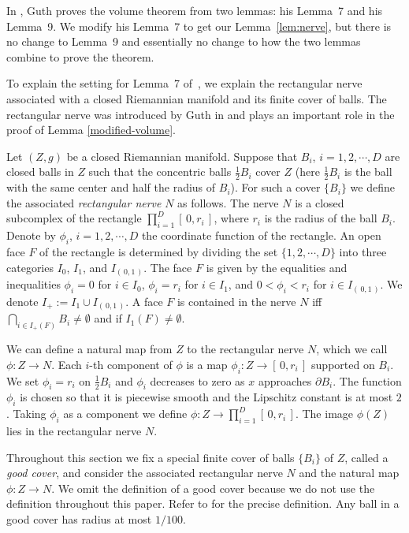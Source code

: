 \documentclass[12pt]{amsart}
\numberwithin{equation}{section}
\begin{document}
In \cite{Guth11}, Guth proves the volume theorem from two lemmas: his Lemma~7 and his Lemma~9.  We modify his Lemma~7 to get our Lemma~\ref{lem:nerve}, but there is no change to Lemma~9 and essentially no change to how the two lemmas combine to prove the theorem.

To explain the setting for Lemma~7 of~\cite{Guth11},  we explain the rectangular nerve associated with a closed Riemannian manifold and its finite cover of balls. The rectangular
nerve was introduced by Guth in \cite{Guth11} and plays an important role in
the proof of Lemma \ref{modified-volume}.

Let $(Z,g)$ be a closed Riemannian manifold. Suppose that $B_i$,
$i=1,2,\cdots, D$ are closed balls in $Z$ such that the concentric balls
$\frac{1}{2}B_i$ cover $Z$ (here $\frac{1}{2}B_i$ is the ball with the
same center and half the radius of $B_i$). For such a cover $\{ B_i\}$ we define the
associated \emph{rectangular nerve} $N$ as follows. The nerve $N$ is a closed subcomplex of the rectangle $\prod_{i=1}^D [\, 0,r_i\,]$, where $r_i$ is
the radius of the ball $B_i$. Denote by $\phi_i$, $i=1,2,\cdots,D$ the coordinate function
of the rectangle. An open face $F$ of the rectangle is determined by
dividing the set $\{1,2,\cdots, D \}$ into three categories $I_0$,
$I_1$, and $I_{(\, 0,1\,)}$. The face $F$ is given by the equalities and
inequalities $\phi_i=0$ for $i\in I_0$, $\phi_i=r_i$ for $i\in I_1$, and
$0<\phi_i<r_i$ for $i\in I_{(\,0,1\,)}$. We denote $I_+:=I_1\cup I_{(\,0,1 \,)}$. A face $F$ is contained in the
nerve $N$ iff $\bigcap_{i\in I_+ (F)}B_i \neq \emptyset$ and if
$I_1(F)\neq \emptyset$.

We can define a natural map from $Z$ to the rectangular nerve $N$, which we call
$\phi:Z\to N$. Each $i$-th component of $\phi$ is a map $\phi_i:Z\to
[\,0,r_i\,]$ supported on $B_i$. We set $\phi_i=r_i$ on $\frac{1}{2}B_i$
and $\phi_i$ decreases to zero as $x$ approaches $\partial B_i$. The
function $\phi_i$ is chosen so that it is piecewise smooth and the
Lipschitz constant is at most $2$. Taking $\phi_i$ as a component we
define $\phi:Z\to \prod_{i=1}^{D}[\,0,r_i\,]$. The image
$ \phi(Z) $ lies in the rectangular nerve $N$.

Throughout this section we fix a special finite cover of balls $\{
B_i\}$ of $Z$, called a \emph{good
cover}, and consider the associated rectangular nerve $N$ and the natural map $\phi:Z\to N$.
We omit the definition of a good cover because we do not use the
definition throughout this paper. Refer to \cite{Guth11} for the precise
definition. Any ball in a good cover has radius at most $1/100$. 
\end{document}
